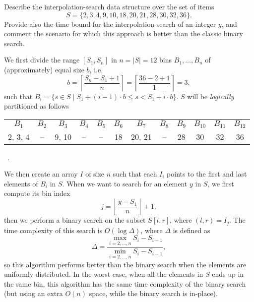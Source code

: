 \exercise

Describe the interpolation-search data structure over the set of items $$S = \{
2, 3, 4, 9, 10, 18, 20, 21, 28, 30, 32, 36 \}.$$ Provide also the time bound for
the interpolation search of an integer $y$, and comment the scenario for which
this approach is better than the classic binary search.

\solution

We first divide the range $[S_1, S_n]$ in $n = |S| = 12$ bins $B_1, \dots, B_n$
of (approximately) equal size $b$, i.e. $$b = \left\lceil\frac{S_n - S_1 +
1}{n}\right\rceil = \left\lceil\frac{36 - 2 + 1}{1}\right\rceil = 3,$$ such that
$B_i = \{ s \in S \mid S_1 + (i - 1) \cdot b \le s < S_1 + i \cdot b \}$.  $S$
will be \emph{logically} partitioned as follows
%
\begin{center}
  \begin{tabular}{c|c|c|c|c|c|c|c|c|c|c|c}
    $B_1$ & $B_2$ & $B_3$ & $B_4$ & $B_5$ & $B_6$ & $B_7$ & $B_8$ & $B_9$ & $B_{10}$ & $B_{11}$ & $B_{12}$ \\
    2, 3, 4 & -- & 9, 10 & -- & -- & 18 & 20, 21 & -- & 28 & 30 & 32 & 36 \\
  \end{tabular}\ .
\end{center}
%
We then create an array $I$ of size $n$ such that each $I_i$ points to the first
and last elements of $B_i$ in $S$. When we want to search for an element $y$ in
$S$, we first compute its bin index $$j = \left\lfloor\frac{y -
S_1}{n}\right\rfloor + 1 ,$$ then we perform a binary search on the subset $S[l,
r]$, where $(l, r) = I_j$. The time complexity of this search is $O(\log
\Delta)$, where $\Delta$ is defined as $$\Delta = \frac{\max_{i = 2, \dots, n}
S_i - S_{i-1}}{\min_{i = 2, \dots, n} S_i - S_{i-1}},$$ so this algorithm
performs better than the binary search when the elements are uniformly
distributed. In the worst case, when all the elements in $S$ ends up in the same
bin, this algorithm has the same time complexity of the binary search (but using
an extra $O(n)$ space, while the binary search is in-place).
